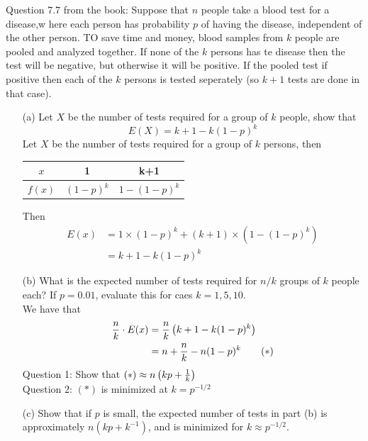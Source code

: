 \documentclass[english, 11pt]{article}
\begin{document}
  Question 7.7 from the book: Suppose that $n$ people take a blood test for a disease,w here each person has probability $p$ of having the disease, independent of the other person. TO save time and money, blood samples from $k$ people are pooled and analyzed together. If none of the $k$ persons has te disease then the test will be negative, but otherwise it will be positive. If the pooled test if positive then each of the $k$ persons is tested seperately (so $k+1$ tests are done in that case).
  \begin{itemize}
    \item[(a)] Let $X$ be the number of tests required for a group of $k$ people, show that
    \[ E(X) = k+1 - k(1-p)^k \]
    Let $X$ be the number of tests required for a group of $k$ persons, then
    \begin{tabular}{c | c c}
        $x$ & 1 & k+1 \\
        \hline
        $f(x)$ & $(1-p)^k$ & $1-(1-p)^k$
      \end{tabular}
    Then
    \begin{align*}
      E(x) & = 1 \times (1-p)^k + (k+1)\times(1- (1-p)^k) \\
          & = k+1 - k(1-p)^k
    \end{align*}

    \item[(b)] What is the expected number of tests required for $n/k$ groups of $k$ people each? If $p = 0.01$, evaluate this for caes $k = 1,5,10$. \\

    We have that
    \begin{align*}
      \frac{n}{k} \cdot E(x) & = \frac{n}{k} \left( k+1 - k(1-p)^k \right) \\
        & = n + \frac{n}{k} - n(1-p)^k \ \ \ \ \ \ (*)
    \end{align*}
Question 1: Show that $(*) \approx n \left( kp + \frac{1}{k} \right)$ \\
    Question 2: $(*)$ is minimized at $k = p^{-1/2}$
    \item[(c)] Show that if $p$ is small, the expected number of tests in part (b) is approximately $n(kp + k^{-1})$, and is minimized for $k \approx p^{-1/2}$. \\


\end{itemize}
\end{document}
